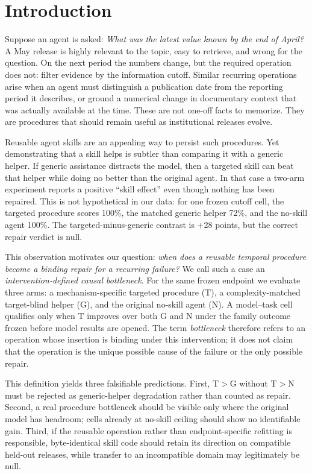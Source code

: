 \section{Introduction}
Suppose an agent is asked: \emph{What was the latest value known by the end of April?} A May release is highly relevant to the topic, easy to retrieve, and wrong for the question. On the next period the numbers change, but the required operation does not: filter evidence by the information cutoff. Similar recurring operations arise when an agent must distinguish a publication date from the reporting period it describes, or ground a numerical change in documentary context that was actually available at the time. These are not one-off facts to memorize. They are procedures that should remain useful as institutional releases evolve.

Reusable agent skills are an appealing way to persist such procedures. Yet demonstrating that a skill helps is subtler than comparing it with a generic helper. If generic assistance distracts the model, then a targeted skill can beat that helper while doing no better than the original agent. In that case a two-arm experiment reports a positive ``skill effect'' even though nothing has been repaired. This is not hypothetical in our data: for one frozen cutoff cell, the targeted procedure scores 100\%, the matched generic helper 72\%, and the no-skill agent 100\%. The targeted-minus-generic contrast is +28 points, but the correct repair verdict is null.

This observation motivates our question: \emph{when does a reusable temporal procedure become a binding repair for a recurring failure?} We call such a case an \emph{intervention-defined causal bottleneck}. For the same frozen endpoint we evaluate three arms: a mechanism-specific targeted procedure (T), a complexity-matched target-blind helper (G), and the original no-skill agent (N). A model--task cell qualifies only when T improves over both G and N under the family outcome frozen before model results are opened. The term \emph{bottleneck} therefore refers to an operation whose insertion is binding under this intervention; it does not claim that the operation is the unique possible cause of the failure or the only possible repair.

This definition yields three falsifiable predictions. First, T$>$G without T$>$N must be rejected as generic-helper degradation rather than counted as repair. Second, a real procedure bottleneck should be visible only where the original model has headroom; cells already at no-skill ceiling should show no identifiable gain. Third, if the reusable operation rather than endpoint-specific refitting is responsible, byte-identical skill code should retain its direction on compatible held-out releases, while transfer to an incompatible domain may legitimately be null.

